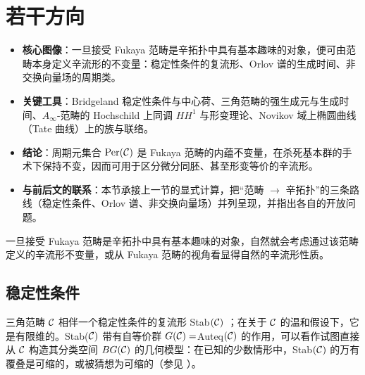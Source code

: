 
\section{若干方向}\label{Sec:Further}

\begin{keypoints}
\begin{itemize}
  \item \textbf{核心图像}：一旦接受 Fukaya 范畴是辛拓扑中具有基本趣味的对象，便可由范畴本身定义辛流形的不变量：稳定性条件的复流形、Orlov 谱的生成时间、非交换向量场的周期类。
  \item \textbf{关键工具}：Bridgeland 稳定性条件与中心荷、三角范畴的强生成元与生成时间、$A_\infty$-范畴的 Hochschild 上同调 $HH^1$ 与形变理论、Novikov 域上椭圆曲线（Tate 曲线）上的族与联络。
  \item \textbf{结论}：周期元集合 $\mathrm{Per}(\mathcal{C})$ 是 Fukaya 范畴的内蕴不变量，在杀死基本群的手术下保持不变，因而可用于区分微分同胚、甚至形变等价的辛流形。
  \item \textbf{与前后文的联系}：本节承接上一节的显式计算，把“范畴 $\to$ 辛拓扑”的三条路线（稳定性条件、Orlov 谱、非交换向量场）并列呈现，并指出各自的开放问题。
\end{itemize}
\end{keypoints}

一旦接受 Fukaya 范畴是辛拓扑中具有基本趣味的对象，自然就会考虑通过该范畴定义的辛流形不变量，或从 Fukaya 范畴的视角看显得自然的辛流形性质。

\renewcommand{\P}{\mathcal{P}}

\subsection{稳定性条件} 三角范畴 $\mathcal{C}$ 相伴一个稳定性条件的复流形 Stab$(\mathcal{C})$ \cite{Bridgeland}；在关于 $\mathcal{C}$ 的温和假设下，它是有限维的。Stab($\mathcal{C})$ 带有自等价群 $G(\mathcal{C})=$Auteq$(\mathcal{C})$ 的作用，可以看作试图直接从 $\mathcal{C}$ 构造其分类空间 $BG(\mathcal{C})$ 的几何模型：在已知的少数情形中，Stab$(\mathcal{C})$ 的万有覆叠是可缩的，或被猜想为可缩的（参见 \cite{Woolf}）。

